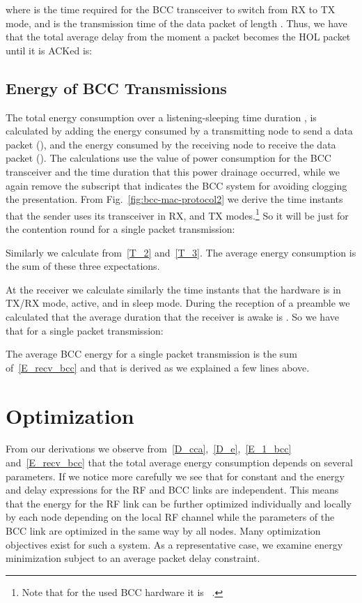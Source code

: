 \documentclass[10pt]{IEEEtran}
\newcounter{section:outage-analysis}
\begin{document}
where  is the time required for the BCC transceiver to switch from RX to TX mode, and  is the transmission time of the data packet of length . Thus, we have that the total average delay from the moment a packet becomes the HOL packet until it is ACKed is:


\subsection{Energy of BCC Transmissions}
The total energy consumption over a listening-sleeping time duration , is calculated by adding the energy consumed by a transmitting node to send a data packet (), and the energy consumed by the receiving node to receive the data packet (). The calculations use the value of power consumption for the BCC transceiver and the time duration that this power drainage occurred, while we again remove the subscript that indicates the BCC system for avoiding clogging the presentation. From Fig.~\ref{fig:bcc-mac-protocol2} we derive the time instants that the sender uses its transceiver in RX, and TX modes.\footnote{Note that for the used BCC hardware it is ~\cite{fazzi09}.} So it will be just for the contention round for a single packet transmission:

Similarly we calculate  from~\eqref{T_2} and~\eqref{T_3}. The average energy consumption  is the sum of these three expectations.

At the receiver we calculate similarly the time instants that the hardware is in TX/RX mode, active, and in sleep mode. During the reception of a preamble we calculated that the average duration that the receiver is awake is . So we have that for a single packet transmission:

The average BCC energy  for a single packet transmission is the sum of~\eqref{E_recv_bcc} and  that is derived as we explained a few lines above.


\section{Optimization}
\label{section:optimization}
From our derivations we observe from~\eqref{D_cca},~\eqref{D_e},~\eqref{E_1_bcc} and~\eqref{E_recv_bcc} that the total average energy consumption depends on several parameters. If we notice more carefully we see that for constant  and  the energy and delay expressions for the RF and BCC links are independent. This means that the energy for the RF link can be further optimized individually and locally by each node depending on the local RF channel while the parameters of the BCC link are optimized in the same way by all nodes. Many optimization objectives exist for such a system. As a representative case, we examine energy minimization subject to an average packet delay constraint.
\end{document}
